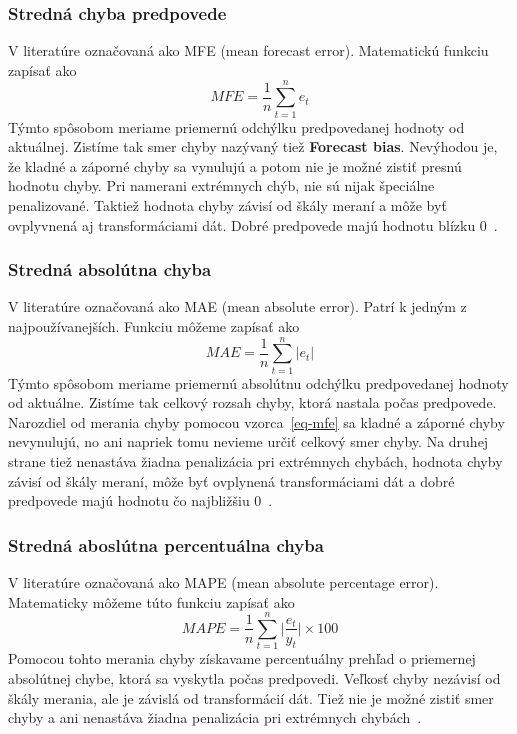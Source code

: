 \documentclass[a4paper,slovak,12pt,appendix]{article}
\begin{document}
\subsubsection{Stredná chyba predpovede}
V literatúre označovaná ako MFE (mean forecast error). Matematickú funkciu zapísať ako
\begin{equation}
  MFE = \frac{1}{n} \sum_{t=1}^{n} e_t
  \label{eq-mfe}
\end{equation}
Týmto spôsobom meriame priemernú odchýlku predpovedanej hodnoty od aktuálnej.
Zistíme tak smer chyby nazývaný tiež \textbf{Forecast bias}. Nevýhodou je, že
kladné a záporné chyby sa vynulujú a potom nie je možné zistiť presnú hodnotu
chyby. Pri namerani extrémnych chýb, nie sú nijak špeciálne penalizované.
Taktiež hodnota chyby závisí od škály meraní a môže byť ovplyvnená aj
transformáciami dát. Dobré predpovede majú hodnotu blízku 0~\cite{Agrawal2013}.

\subsubsection{Stredná absolútna chyba}
V literatúre označovaná ako MAE (mean absolute error). Patrí k jedným
z najpoužívanejších. Funkciu môžeme zapísať ako
\begin{equation}
  MAE = \frac{1}{n} \sum_{t=1}^{n} |e_t|
  \label{eq-mae}
\end{equation}
Týmto spôsobom meriame priemernú absolútnu odchýlku predpovedanej hodnoty od
aktuálne. Zistíme tak celkový rozsah chyby, ktorá nastala počas predpovede.
Narozdiel od merania chyby pomocou vzorca~\ref{eq-mfe} sa kladné a záporné
chyby nevynulujú, no ani napriek tomu nevieme určiť celkový smer chyby.
Na druhej strane tiež nenastáva žiadna penalizácia pri extrémnych chybách,
hodnota chyby závisí od škály meraní, môže byť ovplynená transformáciami dát
a dobré predpovede majú hodnotu čo najbližšiu 0~\cite{Agrawal2013, Gutierrez2015}.

\subsubsection{Stredná aboslútna percentuálna chyba}
V literatúre označovaná ako MAPE (mean absolute percentage error). Matematicky
môžeme túto funkciu zapísať ako
\begin{equation}
  MAPE = \frac{1}{n} \sum_{t=1}^{n} \Big|\frac{e_t}{y_t}\Big| \times 100
  \label{eq-mape}
\end{equation}
Pomocou tohto merania chyby získavame percentuálny prehľad o priemernej
absolútnej chybe, ktorá sa vyskytla počas predpovedi. Veľkosť chyby nezávisí od
škály merania, ale je závislá od transformácií dát. Tiež nie je možné zistiť
smer chyby a ani nenastáva žiadna penalizácia pri extrémnych
chybách~\cite{Agrawal2013}.
\end{document}
